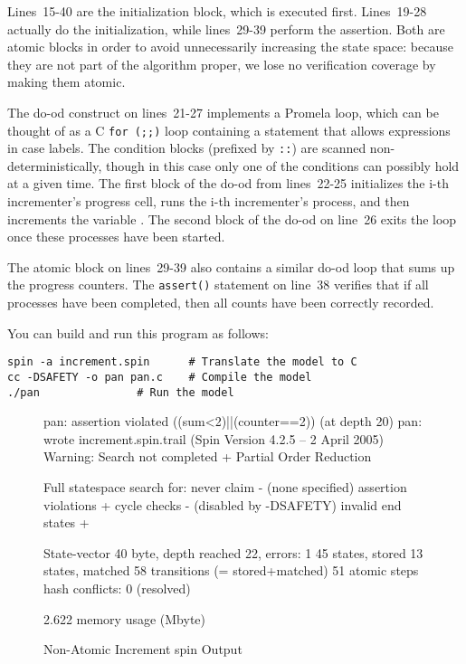 Lines~15-40 are the initialization block, which is executed first.
Lines~19-28 actually do the initialization, while lines~29-39
perform the assertion.
Both are atomic blocks in order to avoid unnecessarily increasing
the state space: because they are not part of the algorithm proper,
we lose no verification coverage by making them atomic.

The do-od construct on lines~21-27 implements a Promela loop,
which can be thought of as a C {\tt for (;;)} loop containing a
 statement that allows expressions in case labels.
The condition blocks (prefixed by {\tt ::})
are scanned non-deterministically,
though in this case only one of the conditions can possibly hold at a given
time.
The first block of the do-od from lines~22-25 initializes the i-th
incrementer's progress cell, runs the i-th incrementer's process, and
then increments the variable .
The second block of the do-od on line~26 exits the loop once
these processes have been started.

The atomic block on lines~29-39 also contains a similar do-od
loop that sums up the progress counters.
The {\tt assert()} statement on line~38 verifies that if all processes
have been completed, then all counts have been correctly recorded.

You can build and run this program as follows:

\vspace{5pt}
\begin{minipage}[t]{\columnwidth}
\scriptsize
\begin{verbatim}
spin -a increment.spin		# Translate the model to C
cc -DSAFETY -o pan pan.c	# Compile the model
./pan				# Run the model
\end{verbatim}
\end{minipage}
\vspace{5pt}

\begin{figure*}[tbp]
{ \scriptsize
\begin{verbbox}
pan: assertion violated ((sum<2)||(counter==2)) (at depth 20)
pan: wrote increment.spin.trail
(Spin Version 4.2.5 -- 2 April 2005)
Warning: Search not completed
        + Partial Order Reduction

Full statespace search for:
        never claim             - (none specified)
        assertion violations    +
        cycle checks            - (disabled by -DSAFETY)
        invalid end states      +

State-vector 40 byte, depth reached 22, errors: 1
      45 states, stored
      13 states, matched
      58 transitions (= stored+matched)
      51 atomic steps
hash conflicts: 0 (resolved)

2.622  memory usage (Mbyte)
\end{verbbox}
}
\centering
\theverbbox
\caption{Non-Atomic Increment spin Output}
\label{fig:analysis:Non-Atomic Increment spin Output}
\end{figure*}

